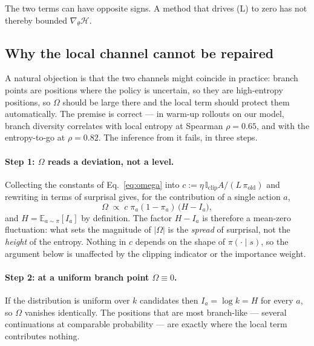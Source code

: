 \documentclass[11pt]{article}
\newcommand{\Htraj}{\mathcal{H}}
\newcommand{\Om}{\Omega}
\newcommand{\E}{\mathbb{E}}
\newcommand{\gradt}{\nabla_{\theta}}
\begin{document}
The two terms can have opposite signs. A method that drives (L) to zero has not
thereby bounded $\gradt \Htraj$.

\subsection{Why the local channel cannot be repaired}
\label{sec:blind}

A natural objection is that the two channels might coincide in practice: branch
points are positions where the policy is uncertain, so they are high-entropy
positions, so $\Om$ should be large there and the local term should protect them
automatically. The premise is correct --- in warm-up rollouts on our model, branch
diversity correlates with local entropy at Spearman $\rho = 0.65$, and with the
entropy-to-go at $\rho = 0.82$. The inference from it fails, in three steps.

\paragraph{Step 1: $\Om$ reads a deviation, not a level.}
Collecting the constants of Eq.~\eqref{eq:omega} into
$c := \eta\,\mathbb{I}_{\mathrm{clip}} A / (L\,\pi_{\mathrm{old}})$ and rewriting in
terms of surprisal gives, for the contribution of a single action $a$,
%
\begin{equation}
\Om \;\propto\; c\;\pi_a(1-\pi_a)\,\bigl(H - I_a\bigr),
\label{eq:omega-surprisal}
\end{equation}
%
and $H = \E_{a\sim\pi}[I_a]$ by definition. The factor $H - I_a$ is therefore a
mean-zero fluctuation: what sets the magnitude of $|\Om|$ is the \emph{spread} of
surprisal, not the \emph{height} of the entropy. Nothing in $c$ depends on the shape
of $\pi(\cdot \mid s)$, so the argument below is unaffected by the clipping
indicator or the importance weight.

\paragraph{Step 2: at a uniform branch point $\Om \equiv 0$.}
If the distribution is uniform over $k$ candidates then $I_a = \log k = H$ for every
$a$, so $\Om$ vanishes identically. The positions that are most branch-like --- several
continuations at comparable probability --- are exactly where the local term
contributes nothing.
\end{document}
